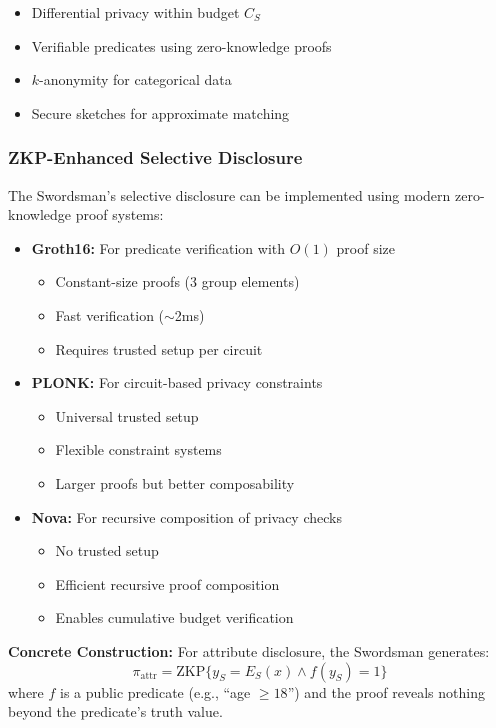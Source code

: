 \documentclass[11pt,a4paper]{article}
\theoremstyle{definition}
\begin{document}
\begin{itemize}
    \item Differential privacy within budget $C_S$
    \item Verifiable predicates using zero-knowledge proofs
    \item $k$-anonymity for categorical data
    \item Secure sketches for approximate matching
\end{itemize}

\subsubsection{ZKP-Enhanced Selective Disclosure}

The Swordsman's selective disclosure can be implemented using modern zero-knowledge proof systems:

\begin{itemize}
    \item \textbf{Groth16:} For predicate verification with $O(1)$ proof size
    \begin{itemize}
        \item Constant-size proofs (3 group elements)
        \item Fast verification ($\sim$2ms)
        \item Requires trusted setup per circuit
    \end{itemize}
    \item \textbf{PLONK:} For circuit-based privacy constraints
    \begin{itemize}
        \item Universal trusted setup
        \item Flexible constraint systems
        \item Larger proofs but better composability
    \end{itemize}
    \item \textbf{Nova:} For recursive composition of privacy checks
    \begin{itemize}
        \item No trusted setup
        \item Efficient recursive proof composition
        \item Enables cumulative budget verification
    \end{itemize}
\end{itemize}

\textbf{Concrete Construction:} For attribute disclosure, the Swordsman generates:
\[
\pi_{\text{attr}} = \text{ZKP}\{y_S = E_S(x) \land f(y_S) = 1\}
\]
where $f$ is a public predicate (e.g., ``age $\geq 18$'') and the proof reveals nothing beyond the predicate's truth value.
\end{document}
